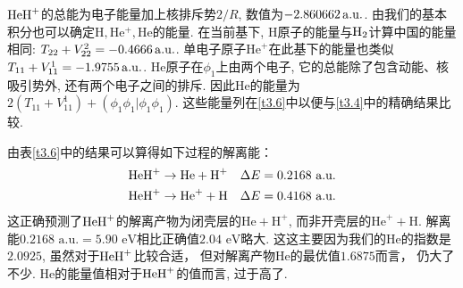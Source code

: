 $\mathrm{HeH}^+$的总能为电子能量加上核排斥势$2/R$, 数值为$-2.860662\,\mathrm{a.u.}$. 
由我们的基本积分也可以确定$\mathrm{H,He^+,He}$的能量. 
在当前基下, $\mathrm{H}$原子的能量与$\mathrm{H}_2$计算中国的能量相同: $T_{22}+V_{22}^2=-0.4666\,\mathrm{a.u.}$. 
单电子原子$\mathrm{He}^+$在此基下的能量也类似$T_{11}+V_{11}^1=-1.9755\,\mathrm{a.u.}$. 
$\mathrm{He}$原子在$\phi_1$上由两个电子, 它的总能除了包含动能、核吸引势外, 还有两个电子之间的排斥. 
因此$\mathrm{He}$的能量为$2(T_{11}+V_{11}^1)+(\phi_1\phi_1|\phi_1\phi_1)$. 
这些能量列在\ref{t3.6}中以便与\ref{t3.4}中的精确结果比较.

由表\ref{t3.6}中的结果可以算得如下过程的解离能：
\begin{align}
	\mathrm{HeH}^+ & \to \text{He} + \text{H}^+ \quad \Delta E = 0.2168\,\, \text{a.u.}\\
	\mathrm{HeH}^+ & \to \text{He}^+ + \text{H} \quad \Delta E = 0.4168\,\, \text{a.u.}
\end{align}
这正确预测了$\mathrm{HeH}^+$的解离产物为闭壳层的$\text{He}+\text{H}^+$, 
而非开壳层的$\text{He}^++\text{H}$. 
解离能$0.2168\,\,\text{a.u.}=5.90\,\,\text{eV}$相比正确值$2.04\,\,\text{eV}$略大.
这这主要因为我们的$\text{He}$的指数是$2.0925$, 
虽然对于$\mathrm{HeH}^+$比较合适， 
但对解离产物$\text{He}$的最优值$1.6875$而言，
仍大了不少. 
$\text{He}$的能量值相对于$\mathrm{HeH}^+$的值而言, 
过于高了.

